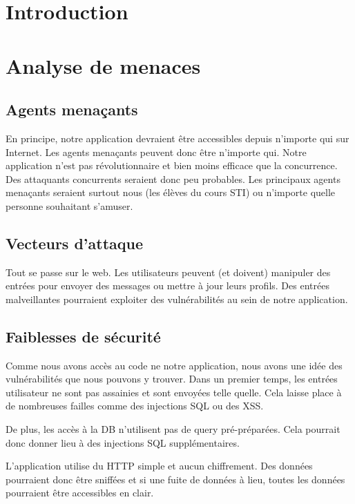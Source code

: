 \documentclass[12pt]{article}
\begin{document}


\tableofcontents

\listoffigures

\newpage
\section{Introduction}

\section{Analyse de menaces}
\subsection{Agents menaçants}
En principe, notre application devraient être accessibles depuis n'importe qui sur Internet. Les agents menaçants peuvent donc être n'importe qui. Notre application n'est pas révolutionnaire et bien moins efficace que la concurrence. Des attaquants concurrents seraient donc peu probables. Les principaux agents menaçants seraient surtout nous (les élèves du cours STI) ou n'importe quelle personne souhaitant s'amuser.

\subsection{Vecteurs d'attaque}
Tout se passe sur le web. Les utilisateurs peuvent (et doivent) manipuler des entrées pour envoyer des messages ou mettre à jour leurs profils. Des entrées malveillantes pourraient exploiter des vulnérabilités au sein de notre application.

\subsection{Faiblesses de sécurité}
Comme nous avons accès au code ne notre application, nous avons une idée des vulnérabilités que nous pouvons y trouver. Dans un premier temps, les entrées utilisateur ne sont pas assainies et sont envoyées telle quelle. Cela laisse place à de nombreuses failles comme des injections SQL ou des XSS.

De plus, les accès à la DB n'utilisent pas de query pré-préparées. Cela pourrait donc donner lieu à des injections SQL supplémentaires.

L'application utilise du HTTP simple et aucun chiffrement. Des données pourraient donc être sniffées et si une fuite de données à lieu, toutes les données pourraient être accessibles en clair.
\end{document}
